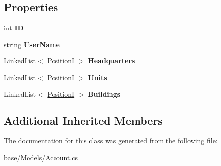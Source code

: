 \subsection*{Properties}
\begin{DoxyCompactItemize}
\item 
\hypertarget{classCore_1_1Models_1_1Account_a7d03d99ad8aef36cd306111624ee9664}{int {\bfseries I\-D}}\label{classCore_1_1Models_1_1Account_a7d03d99ad8aef36cd306111624ee9664}

\item 
\hypertarget{classCore_1_1Models_1_1Account_a1ffe9e8e0cfd0a45234e457a39c2de0f}{string {\bfseries User\-Name}}\label{classCore_1_1Models_1_1Account_a1ffe9e8e0cfd0a45234e457a39c2de0f}

\item 
\hypertarget{classCore_1_1Models_1_1Account_a16db715a6cb365cc3075ba8c2c24f402}{Linked\-List$<$ \hyperlink{classCore_1_1Models_1_1PositionI}{Position\-I} $>$ {\bfseries Headquarters}}\label{classCore_1_1Models_1_1Account_a16db715a6cb365cc3075ba8c2c24f402}

\item 
\hypertarget{classCore_1_1Models_1_1Account_a474b556453f43f821b4b3c79401288ac}{Linked\-List$<$ \hyperlink{classCore_1_1Models_1_1PositionI}{Position\-I} $>$ {\bfseries Units}}\label{classCore_1_1Models_1_1Account_a474b556453f43f821b4b3c79401288ac}

\item 
\hypertarget{classCore_1_1Models_1_1Account_a19c8dc728a99221a064867333f8555f6}{Linked\-List$<$ \hyperlink{classCore_1_1Models_1_1PositionI}{Position\-I} $>$ {\bfseries Buildings}}\label{classCore_1_1Models_1_1Account_a19c8dc728a99221a064867333f8555f6}

\end{DoxyCompactItemize}
\subsection*{Additional Inherited Members}


The documentation for this class was generated from the following file\-:\begin{DoxyCompactItemize}
\item 
base/\-Models/Account.\-cs\end{DoxyCompactItemize}
